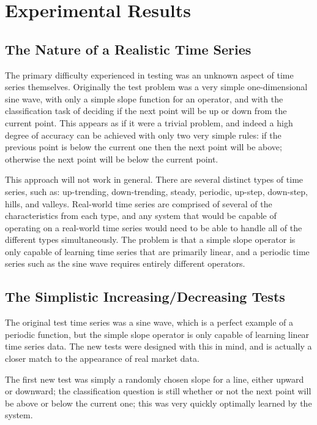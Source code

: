 \section{Experimental Results}
\vspace*{-\baselineskip}
\subsection{The Nature of a Realistic Time Series}
The primary difficulty experienced in testing was an unknown aspect of time series themselves.
Originally the test problem was a very simple one-dimensional sine wave, with only a simple slope function for an operator, and with the classification task of deciding if the next point will be up or down from the current point.
This appears as if it were a trivial problem, and indeed a high degree of accuracy can be achieved with only two very simple rules:
if the previous point is below the current one then the next point will be above;
otherwise the next point will be below the current point.

This approach will not work in general.
There are several distinct types of time series, such as: up-trending, down-trending, steady, periodic, up-step, down-step, hills, and valleys.
Real-world time series are comprised of several of the characteristics from each type, and any system that would be capable of operating on a real-world time series would need to be able to handle all of the different types simultaneously.
The problem is that a simple slope operator is only capable of learning time series that are primarily linear, and a periodic time series such as the sine wave requires entirely different operators.

\subsection{The Simplistic Increasing/Decreasing Tests}
The original test time series was a sine wave, which is a perfect example of a periodic function, but the simple slope operator is only capable of learning linear time series data.
The new tests were designed with this in mind, and is actually a closer match to the appearance of real market data.

The first new test was simply a randomly chosen slope for a line, either upward or downward;
the classification question is still whether or not the next point will be above or below the current one; this was very quickly optimally learned by the system.

